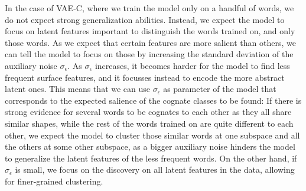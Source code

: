 \documentclass[6pt]{article}
\begin{document}
In the case of VAE-C, where we train the model only on a handful of words, we do not expect strong generalization abilities. Instead, we expect the model to focus on latent features important to distinguish the words trained on, and only those words. %
As we expect that certain features are more salient than others, we can tell the model to focus on those by increasing the standard deviation of the auxiliary noise $\sigma_{\epsilon}$. As $\sigma_{\epsilon}$ increases, it becomes harder for the model to find less frequent surface features, and it focusses instead to encode the more abstract latent ones. This means that we can use $\sigma_{\epsilon}$ as parameter of the model that corresponds to the expected salience of the cognate classes to be found: If there is strong evidence for several words to be cognates to each other as they all share similar shapes, while the rest of the words trained on are quite different to each other, we expect the model to cluster those similar words at one subspace and all the others at some other subspace, as a bigger auxiliary noise hinders the model to generalize the latent features of the less frequent words. On the other hand, if  $\sigma_{\epsilon}$  is small, we focus on the discovery on all latent features in the data, allowing for finer-grained clustering.  
\end{document}
